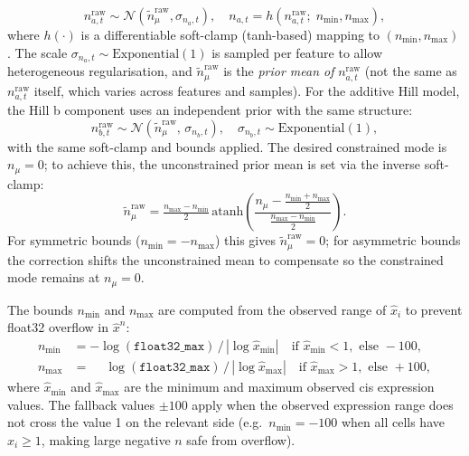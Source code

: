 \documentclass[12pt]{article}
\begin{document}
\begin{equation}
  n_{a,t}^{\mathrm{raw}} \sim \mathcal{N}(\tilde n_\mu^{\mathrm{raw}}, \sigma_{n_a,t}),
  \quad
  n_{a,t} = h(n_{a,t}^{\mathrm{raw}};\; n_{\min}, n_{\max}),
\end{equation}
where $h(\cdot)$ is a differentiable soft-clamp (tanh-based) mapping to $(n_{\min}, n_{\max})$.
The scale $\sigma_{n_a,t} \sim \mathrm{Exponential}(1)$ is sampled per feature to allow
heterogeneous regularisation, and $\tilde n_\mu^{\mathrm{raw}}$ is the \emph{prior mean of}
$n_{a,t}^{\mathrm{raw}}$ (not the same as $n_{a,t}^{\mathrm{raw}}$ itself, which varies
across features and samples).
For the additive Hill model, the Hill b component uses an independent prior with the same
structure:
\begin{equation*}
  n_{b,t}^{\mathrm{raw}} \sim \mathcal{N}(\tilde n_\mu^{\mathrm{raw}},\, \sigma_{n_b,t}),
  \quad \sigma_{n_b,t} \sim \mathrm{Exponential}(1),
\end{equation*}
with the same soft-clamp and bounds applied.
%
The desired constrained mode is $n_\mu = 0$; to achieve this, the unconstrained prior mean
is set via the inverse soft-clamp:
\begin{equation}
  \tilde n_\mu^{\mathrm{raw}}
    = \tfrac{n_{\max}-n_{\min}}{2}\,
      \mathrm{atanh}\!\left(
        \frac{n_\mu - \tfrac{n_{\min}+n_{\max}}{2}}{\tfrac{n_{\max}-n_{\min}}{2}}
      \right).
\end{equation}
For symmetric bounds ($n_{\min} = -n_{\max}$) this gives $\tilde n_\mu^{\mathrm{raw}} = 0$;
for asymmetric bounds the correction shifts the unconstrained mean to compensate so the
constrained mode remains at $n_\mu = 0$.

The bounds $n_{\min}$ and $n_{\max}$ are computed from the observed range of $\hat x_i$
to prevent float32 overflow in $\hat x^n$:
\begin{align}
  n_{\min} &= -\log(\texttt{float32\_max})\,/\,|\log \hat x_{\min}|
    \quad \text{if } \hat x_{\min} < 1, \text{ else } -100, \\
  n_{\max} &= \phantom{-}\log(\texttt{float32\_max})\,/\,|\log \hat x_{\max}|
    \quad \text{if } \hat x_{\max} > 1, \text{ else } +100,
\end{align}
where $\hat x_{\min}$ and $\hat x_{\max}$ are the minimum and maximum observed cis
expression values.
The fallback values $\pm 100$ apply when the observed expression range does not cross
the value 1 on the relevant side (e.g.\ $n_{\min} = -100$ when all cells have
$\hat x_i \ge 1$, making large negative $n$ safe from overflow).
\end{document}
